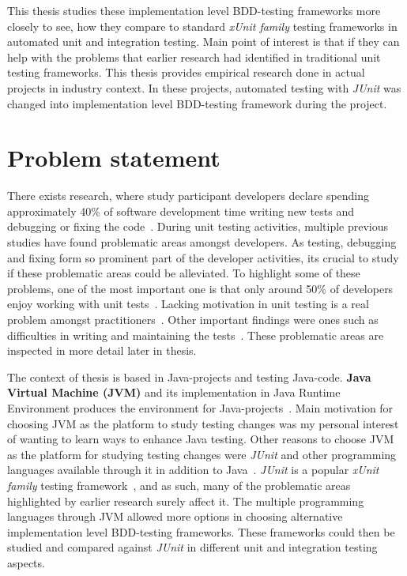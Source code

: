 This thesis studies these implementation level BDD-testing frameworks more closely to see, how they compare to
standard \textit{xUnit family} testing frameworks in automated unit and integration testing.
Main point of interest is that if they can help with the problems that earlier research
had identified in traditional unit testing frameworks. This thesis provides empirical research done in actual projects in industry context.
In these projects, automated testing with \textit{JUnit} was changed into implementation level BDD-testing framework during the project.

\section{Problem statement}
There exists research, where study participant developers declare spending approximately 40\% of software development time
writing new tests and debugging or fixing the code~\cite{daka2014survey}. During unit testing activities, multiple previous
studies have found problematic areas amongst developers. As testing, debugging and fixing form so prominent part of the
developer activities, its crucial to study if these problematic areas could be alleviated.
To highlight some of these problems, one of the most important one is
that only around 50\% of developers enjoy working with unit tests~\cite{daka2014survey}.
Lacking motivation in unit testing is a real problem amongst practitioners~\cite{runeson2006survey}. Other important findings
were ones such as difficulties in writing and maintaining the tests~\cite{daka2014survey}. These problematic areas are inspected
in more detail later in thesis.

The context of thesis is based in Java-projects and testing Java-code. \textbf{Java Virtual Machine (JVM)} and its
implementation in Java Runtime Environment produces the environment for Java-projects~\cite{wiki:jvm}.
Main motivation for choosing JVM as the platform to study testing changes was my personal interest of wanting to learn ways to enhance
Java testing.
Other reasons to choose JVM as the platform for studying testing changes were \textit{JUnit} and other programming
languages available through it in addition to Java~\cite{wiki:jvm}. \textit{JUnit} is a popular \textit{xUnit family} testing framework~\cite{hamill2004unit}, and as such,
many of the problematic areas highlighted by earlier research surely affect it. The multiple programming languages through JVM
allowed more options in choosing alternative implementation level BDD-testing frameworks. These frameworks could then be studied and compared
against \textit{JUnit} in different unit and integration testing aspects.



